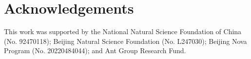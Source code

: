 \documentclass{article}
\begin{document}
\section*{Acknowledgements}
This work was supported by the National Natural Science Foundation of China (No. 92470118); Beijing Natural Science Foundation (No. L247030); Beijing Nova Program (No. 20220484044); and Ant Group Research Fund.















\end{document}
